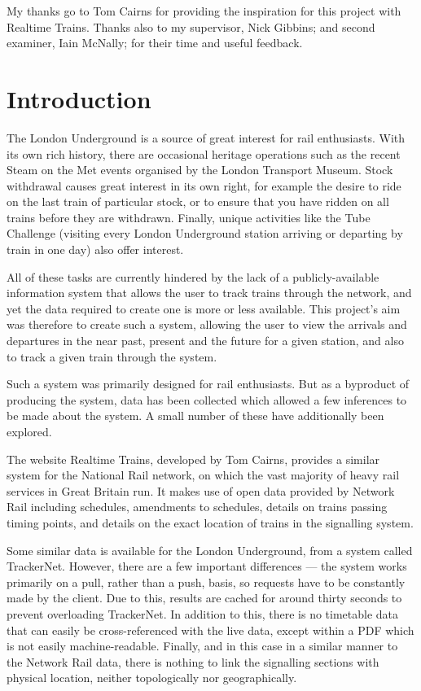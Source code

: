 \documentclass[a4paper,12pt,twoside]{report}
\begin{document}
My thanks go to Tom Cairns for providing the inspiration for this project with
Realtime Trains. Thanks also to my supervisor, Nick Gibbins; and second
examiner, Iain McNally; for their time and useful feedback.

\pagebreak

\chapter{Introduction}

The London Underground is a source of great interest for rail enthusiasts. With
its own rich history, there are occasional heritage operations such as the
recent Steam on the Met events organised by the London Transport Museum. Stock
withdrawal causes great interest in its own right, for example the desire to
ride on the last train of particular stock, or to ensure that you have ridden
on all trains before they are withdrawn. Finally, unique activities like the
Tube Challenge (visiting every London Underground station arriving or departing
by train in one day) also offer interest.

All of these tasks are currently hindered by the lack of a publicly-available
information system that allows the user to track trains through the network,
and yet the data required to create one is more or less available. This
project's aim was therefore to create such a system, allowing the user to view
the arrivals and departures in the near past, present and the future for a
given station, and also to track a given train through the system.

Such a system was primarily designed for rail enthusiasts. But as a byproduct
of producing the system, data has been collected which allowed a few inferences
to be made about the system. A small number of these have additionally been
explored.

The website Realtime Trains, developed by Tom Cairns, provides a similar system
for the National Rail network, on which the vast majority of heavy rail
services in Great Britain run. It makes use of open data provided by Network
Rail including schedules, amendments to schedules, details on trains passing
timing points, and details on the exact location of trains in the signalling
system.

Some similar data is available for the London Underground, from a system called
TrackerNet. However, there are a few important differences --- the system works
primarily on a pull, rather than a push, basis, so requests have to be
constantly made by the client. Due to this, results are cached for around
thirty seconds to prevent overloading TrackerNet. In addition to this, there is
no timetable data that can easily be cross-referenced with the live data,
except within a PDF which is not easily machine-readable. Finally, and in this
case in a similar manner to the Network Rail data, there is nothing to link the
signalling sections with physical location, neither topologically nor
geographically.
\end{document}
